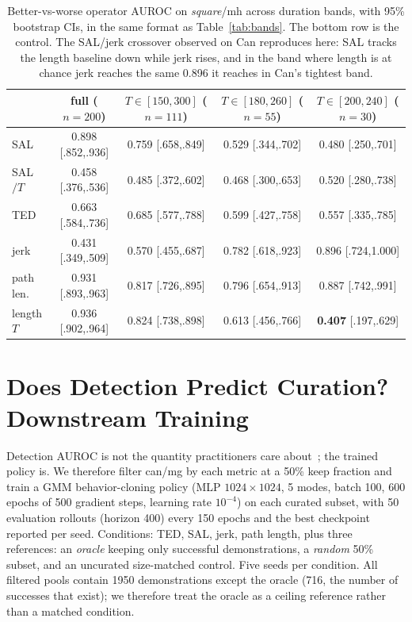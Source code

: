 \documentclass[10pt]{article}
\begin{document}
\begin{table}[t]
\centering
\small
\begin{tabular}{lcccc}
\toprule
& full ($n{=}200$) & $T \in [150,300]$ ($n{=}111$) & $T \in [180,260]$ ($n{=}55$) & $T \in [200,240]$ ($n{=}30$) \\
\midrule
SAL       & 0.898 [.852,.936] & 0.759 [.658,.849] & 0.529 [.344,.702] & 0.480 [.250,.701] \\
SAL$/T$   & 0.458 [.376,.536] & 0.485 [.372,.602] & 0.468 [.300,.653] & 0.520 [.280,.738] \\
TED       & 0.663 [.584,.736] & 0.685 [.577,.788] & 0.599 [.427,.758] & 0.557 [.335,.785] \\
jerk      & 0.431 [.349,.509] & 0.570 [.455,.687] & 0.782 [.618,.923] & 0.896 [.724,1.000] \\
path len. & 0.931 [.893,.963] & 0.817 [.726,.895] & 0.796 [.654,.913] & 0.887 [.742,.991] \\
\midrule
length $T$ & 0.936 [.902,.964] & 0.824 [.738,.898] & 0.613 [.456,.766] & \textbf{0.407} [.197,.629] \\
\bottomrule
\end{tabular}
\caption{Better-vs-worse operator AUROC on \emph{square}/mh across duration
bands, with 95\% bootstrap CIs, in the same format as
Table~\ref{tab:bands}. The bottom row is the control. The SAL/jerk
crossover observed on Can reproduces here: SAL tracks the length baseline
down while jerk rises, and in the band where length is at chance jerk
reaches the same 0.896 it reaches in Can's tightest band.}
\label{tab:square}
\end{table}

\section{Does Detection Predict Curation? Downstream Training}
\label{sec:training}

Detection AUROC is not the quantity practitioners care
about~\citep{bedi-policy}; the trained policy is. We therefore filter can/mg
by each metric at a 50\% keep fraction and train a GMM behavior-cloning
policy (MLP $1024{\times}1024$, 5 modes, batch 100, 600 epochs of 500
gradient steps, learning rate $10^{-4}$) on each curated subset, with 50
evaluation rollouts (horizon 400) every 150 epochs and the best checkpoint
reported per seed. Conditions: TED, SAL, jerk, path length, plus three
references: an \emph{oracle} keeping only successful demonstrations, a
\emph{random} 50\% subset, and an uncurated size-matched control. Five seeds
per condition. All filtered pools contain 1950 demonstrations except the
oracle (716, the number of successes that exist); we therefore treat the
oracle as a ceiling reference rather than a matched condition.
\end{document}
